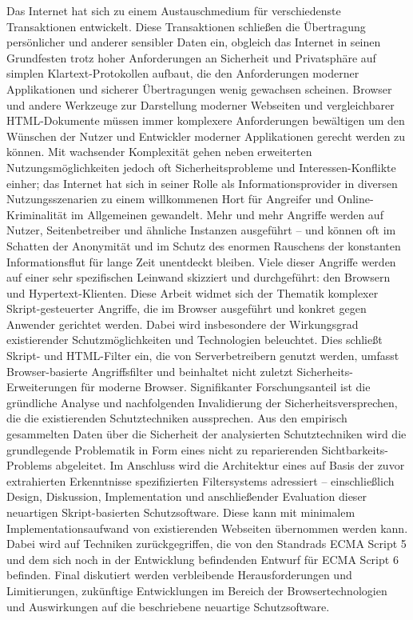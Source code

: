 \documentclass{llncs}
\begin{document}
Das Internet hat sich zu einem Austauschmedium für verschiedenste Transaktionen entwickelt. Diese Transaktionen schließen die Übertragung persönlicher und anderer sensibler Daten ein, obgleich das Internet in seinen Grundfesten trotz hoher Anforderungen an Sicherheit und Privatsphäre auf simplen Klartext-Protokollen aufbaut, die den Anforderungen moderner Applikationen und sicherer Übertragungen wenig gewachsen scheinen. Browser und andere Werkzeuge zur Darstellung moderner Webseiten und vergleichbarer HTML-Dokumente müssen immer komplexere Anforderungen bewältigen um den Wünschen der Nutzer und Entwickler moderner Applikationen gerecht werden zu können. Mit wachsender Komplexität gehen neben erweiterten Nutzungsmöglichkeiten jedoch oft Sicherheitsprobleme und Interessen-Konflikte einher; das Internet hat sich in seiner Rolle als Informationsprovider in diversen Nutzungsszenarien zu einem willkommenen Hort für Angreifer und Online-Kriminalität im Allgemeinen gewandelt. Mehr und mehr Angriffe werden auf Nutzer, Seitenbetreiber und ähnliche Instanzen ausgeführt -- und können oft im Schatten der Anonymität und im Schutz des enormen Rauschens der konstanten Informationsflut für lange Zeit unentdeckt bleiben. Viele dieser Angriffe werden auf einer sehr spezifischen Leinwand skizziert und durchgeführt: den Browsern und Hypertext-Klienten. Diese Arbeit widmet sich der Thematik komplexer Skript-gesteuerter Angriffe, die im Browser ausgeführt und konkret gegen Anwender gerichtet werden. Dabei wird insbesondere der Wirkungsgrad existierender Schutzmöglichkeiten und Technologien beleuchtet. Dies schließt Skript- und HTML-Filter ein, die von Serverbetreibern genutzt werden, umfasst Browser-basierte Angriffsfilter und beinhaltet nicht zuletzt Sicherheits-Erweiterungen für moderne Browser. Signifikanter Forschungsanteil ist die gründliche Analyse und nachfolgenden Invalidierung der Sicherheitsversprechen, die die existierenden Schutztechniken aussprechen. Aus den empirisch gesammelten Daten über die Sicherheit der analysierten Schutztechniken wird die grundlegende Problematik in Form eines nicht zu reparierenden Sichtbarkeits-Problems abgeleitet. Im Anschluss wird die Architektur eines auf Basis der zuvor extrahierten Erkenntnisse spezifizierten Filtersystems adressiert -- einschließlich Design, Diskussion, Implementation und anschließender Evaluation dieser neuartigen Skript-basierten Schutzsoftware. Diese kann mit minimalem Implementationsaufwand von existierenden Webseiten übernommen werden kann. Dabei wird auf Techniken zurückgegriffen, die von den Standrads ECMA Script 5 und dem sich noch in der Entwicklung befindenden Entwurf für ECMA Script 6 befinden.
Final diskutiert werden verbleibende Herausforderungen und Limitierungen, zukünftige Entwicklungen im Bereich der Browsertechnologien und Auswirkungen auf die beschriebene neuartige Schutzsoftware.

\end{document}
